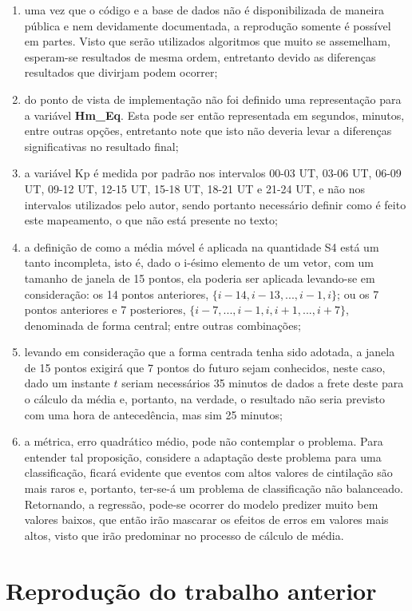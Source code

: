 \begin{enumerate}
\item uma vez que o código e a base de dados não é disponibilizada de maneira pública e nem devidamente documentada, a reprodução somente é possível em partes. Visto que serão utilizados algoritmos que muito se assemelham, esperam-se resultados de mesma ordem, entretanto devido as diferenças resultados que divirjam podem ocorrer;
\item do ponto de vista de implementação não foi definido uma representação para a variável {\bf Hm\_Eq}. Esta pode ser então representada em segundos, minutos, entre outras opções, entretanto note que isto não deveria levar a diferenças significativas no resultado final;
\item a variável Kp é medida por padrão nos intervalos 00-03 UT, 03-06 UT, 06-09 UT, 09-12 UT, 12-15 UT, 15-18 UT, 18-21 UT e 21-24 UT, e não nos intervalos utilizados pelo autor, sendo portanto necessário definir como é feito este mapeamento, o que não está presente no texto;
\item a definição de como a média móvel é aplicada na quantidade S4 está um tanto incompleta, isto é, dado o i-ésimo elemento de um vetor, com um tamanho de janela de 15 pontos, ela poderia ser aplicada levando-se em consideração: os 14 pontos anteriores, $\{i-14, i-13, ..., i-1, i\}$; ou os 7 pontos anteriores e 7 posteriores, $\{i-7,...,i-1,i,i+1,...,i+7\}$, denominada de forma central; entre outras combinações;
\item levando em consideração que a forma centrada tenha sido adotada, a janela de 15 pontos exigirá que 7 pontos do futuro sejam conhecidos, neste caso, dado um instante $t$ seriam necessários 35 minutos de dados a frete deste para o cálculo da média e,  portanto, na verdade, o resultado não seria previsto com uma hora de antecedência, mas sim 25 minutos;
\item a métrica, erro quadrático médio, pode não contemplar o problema. Para entender tal proposição, considere a adaptação deste problema para uma classificação, ficará evidente que eventos com altos valores de cintilação são mais raros e, portanto, ter-se-á um problema de classificação não balanceado. Retornando, a regressão, pode-se ocorrer do modelo predizer muito bem valores baixos, que então irão mascarar os efeitos de erros em valores mais altos, visto que irão predominar no processo de cálculo de média.
\end{enumerate}

\section{Reprodução do trabalho anterior}\label{se:rep}

